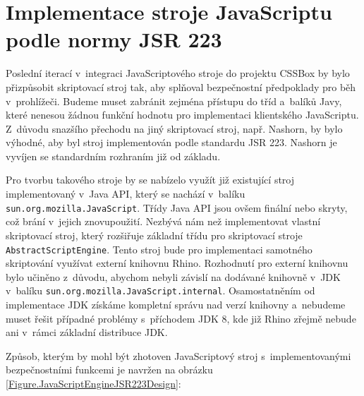 \section{Implementace stroje JavaScriptu podle normy JSR 223}
\label{Chapter.Design.JavaScriptEngineJSR223}

Poslední iterací v~integraci JavaScriptového stroje do projektu CSSBox by bylo přizpůsobit skriptovací stroj tak, aby splňoval bezpečnostní předpoklady pro běh v~prohlížeči. Budeme muset zabránit zejména přístupu do tříd a~balíků Javy, které nenesou žádnou funkční hodnotu pro implementaci klientského JavaScriptu. Z~důvodu snazšího přechodu na jiný skriptovací stroj, např. Nashorn, by bylo výhodné, aby byl stroj implementován podle standardu JSR 223. Nashorn je vyvíjen se standardním rozhraním již od základu.

Pro tvorbu takového stroje by se nabízelo využít již existující stroj implementovaný v~Java API, který se nachází v~balíku \texttt{sun.org.mozilla.JavaScript}. Třídy Java API jsou ovšem finální nebo skryty, což brání v~jejich znovupoužití. Nezbývá nám než implementovat vlastní skriptovací stroj, který rozšiřuje základní třídu pro skriptovací stroje \texttt{AbstractScriptEngine}. Tento stroj bude pro implementaci samotného skriptování využívat externí knihovnu Rhino. Rozhodnutí pro externí knihovnu bylo učiněno z~důvodu, abychom nebyli závislí na dodávané knihovně v~JDK v~balíku \texttt{sun.org.mozilla.JavaScript.internal}. Osamostatněním od implementace JDK získáme kompletní správu nad verzí knihovny a~nebudeme muset řešit případné problémy s~příchodem JDK 8, kde již Rhino zřejmě nebude ani v~rámci základní distribuce JDK.

Způsob, kterým by mohl být zhotoven JavaScriptový stroj s~implementovanými bezpečnostními funkcemi je navržen na obrázku \ref{Figure.JavaScriptEngineJSR223Design}:

